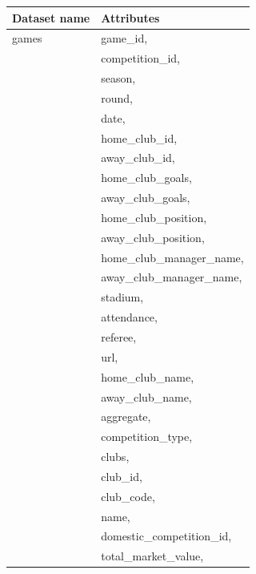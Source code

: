 \documentclass{Configuration_Files/PoliMi3i_thesis}
\begin{document}
\begin{tabular}{|l|p{13cm}|}
	\hline
  \rowcolor{bluepoli!40}
	\textbf{Dataset name} & \textbf{Attributes}                       \\
	\hline
    games
    & game\_id,                                 \\
    & competition\_id,                          \\
    & season,                                   \\
    & round,                                    \\
    & date,                                     \\
    & home\_club\_id,                           \\
    & away\_club\_id,                           \\
    & home\_club\_goals,                        \\
    & away\_club\_goals,                        \\
    & home\_club\_position,                     \\
    & away\_club\_position,                     \\
    & home\_club\_manager\_name,                \\
    & away\_club\_manager\_name,                \\
    & stadium,                                  \\
    & attendance,                               \\
    & referee,                                  \\
    & url,                                      \\
    & home\_club\_name,                         \\
    & away\_club\_name,                         \\
    & aggregate,                                \\
    & competition\_type,                        \\
    & clubs,                                    \\
    & club\_id,                                 \\
    & club\_code,                               \\
    & name,                                     \\
    & domestic\_competition\_id,                \\
    & total\_market\_value,                     \\

\end{tabular}
\end{document}
